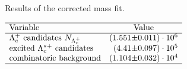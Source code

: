  
\begin{table}[h]
    \centering
    \caption{Results of the \Lc corrected mass fit.}
    \label{tab:fit_correctedMass}
    $\begin{array}{lr@{\pm}l}
    \hline
    \text{Variable} & \multicolumn{2}{c}{\text{Value}} \\
    \hline
        \text{\Lc candidates \NLc}&(1.551 & 0.011) \cdot 10^{6}\\
\text{excited \Lcstar candidates}&(4.41 & 0.097) \cdot 10^{5}\\
\text{combinatoric background}&(1.104 & 0.032) \cdot 10^{4}\\

\hline
\end{array}$
\end{table}
    